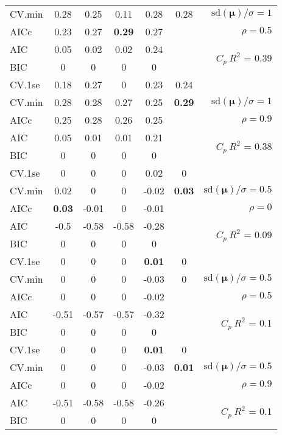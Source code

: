 \documentclass[12pt]{article}
\newcommand{\mr}[1]{\mathrm{#1}}
\newcommand{\bm}[1]{\mathbf{#1}}
\begin{document}
\begin{table}[p]
\begin{center}
\begin{tabular}{l*{5}{c}|r}
CV.min & 0.28 & 0.25 & 0.11 & 0.28 & 0.28 &  $\mr{sd}(\bm{\mu})/\sigma=1$ \\
AICc & 0.23 & 0.27 & {\bf 0.29} & 0.27 & & $\rho=0.5$ \\
AIC & 0.05 & 0.02 & 0.02 & 0.24 & & \multirow{2}{*}{$C_p ~ R^2$ = 0.39} \\
BIC & 0 & 0 & 0 & 0 & & \\
 \hline 
CV.1se & 0.18 & 0.27 & 0 & 0.23 & 0.24 &\\
CV.min & 0.28 & 0.28 & 0.27 & 0.25 & {\bf 0.29} &  $\mr{sd}(\bm{\mu})/\sigma=1$ \\
AICc & 0.25 & 0.28 & 0.26 & 0.25 & & $\rho=0.9$ \\
AIC & 0.05 & 0.01 & 0.01 & 0.21 & & \multirow{2}{*}{$C_p ~ R^2$ = 0.38} \\
BIC & 0 & 0 & 0 & 0 & & \\
 \hline 
CV.1se & 0 & 0 & 0 & 0.02 & 0 &\\
CV.min & 0.02 & 0 & 0 & -0.02 & {\bf 0.03} &  $\mr{sd}(\bm{\mu})/\sigma=0.5$ \\
AICc & {\bf 0.03} & -0.01 & 0 & -0.01 & & $\rho=0$ \\
AIC & -0.5 & -0.58 & -0.58 & -0.28 & & \multirow{2}{*}{$C_p ~ R^2$ = 0.09} \\
BIC & 0 & 0 & 0 & 0 & & \\
 \hline 
CV.1se & 0 & 0 & 0 & {\bf 0.01} & 0 &\\
CV.min & 0 & 0 & 0 & -0.03 & 0 &  $\mr{sd}(\bm{\mu})/\sigma=0.5$ \\
AICc & 0 & 0 & 0 & -0.02 & & $\rho=0.5$ \\
AIC & -0.51 & -0.57 & -0.57 & -0.32 & & \multirow{2}{*}{$C_p ~ R^2$ = 0.1} \\
BIC & 0 & 0 & 0 & 0 & & \\
 \hline 
CV.1se & 0 & 0 & 0 & {\bf 0.01} & 0 &\\
CV.min & 0 & 0 & 0 & -0.03 & {\bf 0.01} &  $\mr{sd}(\bm{\mu})/\sigma=0.5$ \\
AICc & 0 & 0 & 0 & -0.02 & & $\rho=0.9$ \\
AIC & -0.51 & -0.58 & -0.58 & -0.26 & & \multirow{2}{*}{$C_p ~ R^2$ = 0.1} \\
BIC & 0 & 0 & 0 & 0 & & \\
 \hline 
\end{tabular}
\end{center}
\vspace{-1cm}
\end{table}
\end{document}
